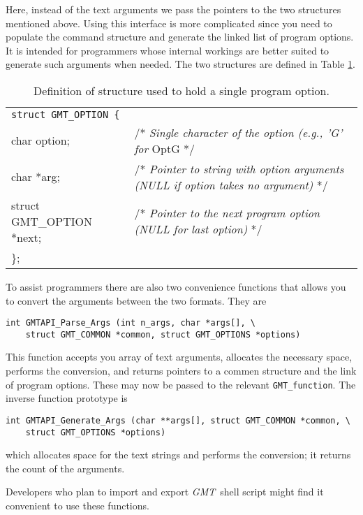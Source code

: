 \documentclass{report}
\newcommand{\GMT}{\textit{GMT}}%
\newcommand{\GMT}{\htmladdnormallink{\texttt{[image: eps/GMT\_glyph10.eps]}}{http://gmt.soest.hawaii.edu}}%
\newcommand{\GMT}{\htmladdnormallink{\textbf{GMT}}{http://gmt.soest.hawaii.edu}}%
\begin{document}
Here, instead of the text arguments we pass the pointers to the two structures mentioned above.  Using
this interface is more complicated since you need to populate the command structure and generate the linked
list of program options.  It is intended for programmers whose internal workings are better suited to
generate such arguments when needed.  The two structures are defined in Table \ref{tbl:methods}.
\begin{table}[h]
\small
\centering
\begin{tabular}{ll} \hline
\multicolumn{2}{l}{\texttt{struct GMT\_OPTION \{}} \\
char option;			&       /* {\it Single character of the option (e.g., 'G' for} Opt{G} */ \\
char *arg;			&       /* {\it Pointer to string with option arguments (NULL if option takes no argument)} */ \\
struct GMT\_OPTION *next;	&       /* {\it Pointer to the next program option (NULL for last option)}  */\\ 
\};	&        \\ \hline
\end{tabular}
\caption{Definition of structure used to hold a single program option.} \label{tbl:methods}
\end{table}

To assist programmers there are also two convenience functions that
allows you to convert the arguments between the two formats.  They are

\begin{verbatim}
int GMTAPI_Parse_Args (int n_args, char *args[], \
    struct GMT_COMMON *common, struct GMT_OPTIONS *options)
\end{verbatim}

This function accepts you array of text arguments, allocates the necessary space, performs the conversion,
and returns pointers to a commen structure and the link of program options.  These may now be passed to the
relevant \texttt{GMT\_function}.  The inverse function prototype is

\begin{verbatim}
int GMTAPI_Generate_Args (char **args[], struct GMT_COMMON *common, \
    struct GMT_OPTIONS *options)
\end{verbatim}

which allocates space for the text strings and performs the conversion; it returns the count of the arguments.

Developers who plan to import and export \GMT\ shell script might find it convenient to use these functions.
\end{document}
